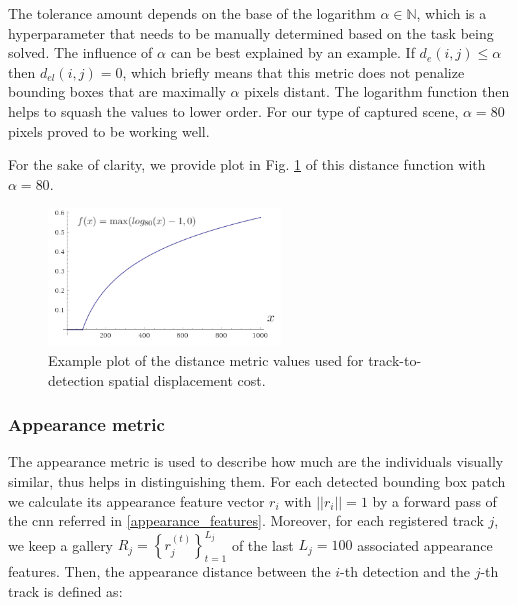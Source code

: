             The tolerance amount depends on the base of the logarithm $\alpha \in \mathbb{N}$, which is a hyperparameter that needs to be manually determined based on the task being solved. The influence of $\alpha$ can be best explained by an example. If $d_e(i,j) \leq \alpha$ then $d_{el}(i,j) = 0$, which briefly means that this metric does not penalize bounding boxes that are maximally $\alpha$ pixels distant. 
            The logarithm function then helps to squash the values to lower order. For our type of captured scene, $\alpha = 80$ pixels proved to be working well. 
            
            For the sake of clarity, we provide plot in Fig. \ref{fig:state_formula_plot} of this distance function with $\alpha = 80$.
            
            \begin{figure}[ht]
                \centering
                \includegraphics[width=0.55\textwidth]{resources/state_formula_plot.png}
                \caption{Example plot of the distance metric values used for track-to-detection spatial displacement cost.}
                \label{fig:state_formula_plot}
            \end{figure}
            
        \subsubsection{Appearance metric}\label{appearance_metric}
            The appearance metric is used to describe how much are the individuals visually similar, thus helps in distinguishing them. For each detected bounding box patch we calculate its appearance feature vector $r_i$ with $||r_i|| = 1$ by a forward pass of the \gls{cnn} referred in \ref{appearance_features}. Moreover, for each registered track $j$, we keep a gallery $R_j = \left\{ r_j^{(t)}\right\}_{t=1}^{L_j} $ of the last $L_j = 100$ associated appearance features. Then, the appearance distance between the $i$-th detection and the $j$-th track is defined as:
            
